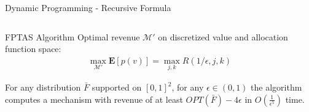\documentclass{beamer}
\begin{document}
\begin{frame}{Dynamic Programming - Recursive Formula}
\begin{columns}
\begin{column}{.4\textwidth}
\begin{center}
      \end{center}
    \end{column}
  \end{columns}
\end{frame}

\begin{frame}{FPTAS Algorithm}
  Optimal revenue $\mathcal{M}'$ on discretized value and allocation function space:
  \begin{align*}
    \max_{\mathcal{M}'} \mathbf{E}\left[p(v)\right] = \max_{j,k} R(1/\epsilon, j, k)
  \end{align*}

  \begin{theorem}
    For any distribution $\bar{F}$ supported on $[0,1]^2$, for any $\epsilon \in (0,1)$ the algorithm computes a mechanism with revenue of at least $OPT(\bar{F}) - 4\epsilon$ in $O(\frac{1}{\epsilon^5})$ time.
  \end{theorem}
\end{frame}
\end{document}
